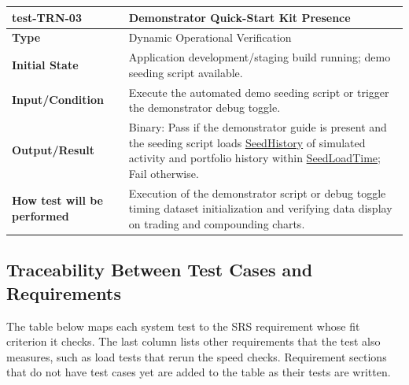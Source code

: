 \documentclass[12pt, titlepage]{article}
\newcommand{\const}[1]{\hyperlink{const:#1}{\textsf{#1}}}
\begin{document}
\vspace{1em}

\noindent\begin{tabularx}{\textwidth}{>{\raggedright\arraybackslash}p{3.5cm}X}
  \toprule
  \textbf{test-TRN-03} & \textbf{Demonstrator Quick-Start Kit Presence}\\
  \midrule
  \textbf{Type} & Dynamic Operational Verification\\
  \textbf{Initial State} & Application development/staging build running; demo seeding script available.\\
  \textbf{Input/Condition} & Execute the automated demo seeding script or trigger the demonstrator debug toggle.\\
  \textbf{Output/Result} & Binary: Pass if the demonstrator guide is present and the seeding script loads \const{SeedHistory} of simulated activity and portfolio history within \const{SeedLoadTime}; Fail otherwise.\\
  \textbf{How test will be performed} & Execution of the demonstrator script or debug toggle timing dataset initialization and verifying data display on trading and compounding charts.\\
  \bottomrule
\end{tabularx}

\subsection{Traceability Between Test Cases and Requirements}

The table below maps each system test to the SRS requirement whose fit
criterion it checks. The last column lists other requirements that the test
also measures, such as load tests that rerun the speed checks. Requirement
sections that do not have test cases yet are added to the table as their tests
are written.
\end{document}
